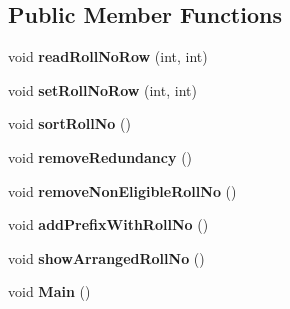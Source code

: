 \subsection*{Public Member Functions}
\begin{DoxyCompactItemize}
\item 
\hypertarget{classArrangeRollNo_a6b15c3ef22ad9d0161d683ce2439d866}{void {\bfseries read\-Roll\-No\-Row} (int, int)}\label{classArrangeRollNo_a6b15c3ef22ad9d0161d683ce2439d866}

\item 
\hypertarget{classArrangeRollNo_af2112cc0540dcfb87b002eb16675ad0c}{void {\bfseries set\-Roll\-No\-Row} (int, int)}\label{classArrangeRollNo_af2112cc0540dcfb87b002eb16675ad0c}

\item 
\hypertarget{classArrangeRollNo_ad497a366004e883cb229a7443d78a09f}{void {\bfseries sort\-Roll\-No} ()}\label{classArrangeRollNo_ad497a366004e883cb229a7443d78a09f}

\item 
\hypertarget{classArrangeRollNo_ac7b9ccb7e9b16a1e3f7ce36f0f7e710b}{void {\bfseries remove\-Redundancy} ()}\label{classArrangeRollNo_ac7b9ccb7e9b16a1e3f7ce36f0f7e710b}

\item 
\hypertarget{classArrangeRollNo_a03d81310eb8db5676c6b4dd3c309b019}{void {\bfseries remove\-Non\-Eligible\-Roll\-No} ()}\label{classArrangeRollNo_a03d81310eb8db5676c6b4dd3c309b019}

\item 
\hypertarget{classArrangeRollNo_a540e34bbe855a585e43001d58f2acddb}{void {\bfseries add\-Prefix\-With\-Roll\-No} ()}\label{classArrangeRollNo_a540e34bbe855a585e43001d58f2acddb}

\item 
\hypertarget{classArrangeRollNo_a301d4e37ad9c9e9c58c566729475ac6c}{void {\bfseries show\-Arranged\-Roll\-No} ()}\label{classArrangeRollNo_a301d4e37ad9c9e9c58c566729475ac6c}

\item 
\hypertarget{classArrangeRollNo_a23bd9e4a41bc717197ca090fddb0b1cd}{void {\bfseries Main} ()}\label{classArrangeRollNo_a23bd9e4a41bc717197ca090fddb0b1cd}

\end{DoxyCompactItemize}
